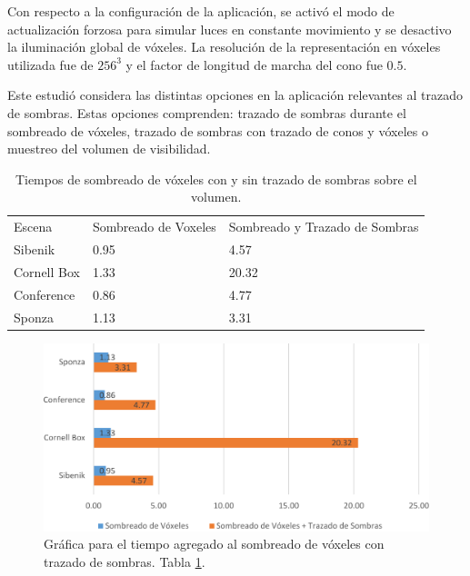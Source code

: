 Con respecto a la configuración de la aplicación, se activó el modo de actualización forzosa para simular luces en constante movimiento y se desactivo la iluminación global de vóxeles. La resolución de la representación en vóxeles utilizada fue de $256^3$ y el factor de longitud de marcha del cono fue $0.5$.

Este estudió considera las distintas opciones en la aplicación relevantes al trazado de sombras. Estas opciones comprenden: trazado de sombras durante el sombreado de vóxeles, trazado de sombras con trazado de conos y vóxeles o muestreo del volumen de visibilidad.

\begin{table}[h]
\centering
\begin{tabular}{lll}
                                  &                                           &                                                                \\ \hline
\multicolumn{1}{|l|}{Escena}      & \multicolumn{1}{l|}{Sombreado de Voxeles} & \multicolumn{1}{l|}{Sombreado y Trazado de Sombras} \\ \hline
\multicolumn{1}{|l|}{Sibenik}     & \multicolumn{1}{l|}{0.95}                 & \multicolumn{1}{l|}{4.57}                                      \\
\multicolumn{1}{|l|}{Cornell Box} & \multicolumn{1}{l|}{1.33}                 & \multicolumn{1}{l|}{20.32}                                     \\
\multicolumn{1}{|l|}{Conference}  & \multicolumn{1}{l|}{0.86}                 & \multicolumn{1}{l|}{4.77}                                      \\
\multicolumn{1}{|l|}{Sponza}      & \multicolumn{1}{l|}{1.13}                 & \multicolumn{1}{l|}{3.31}                                      \\ \hline
\end{tabular}
\caption{Tiempos de sombreado de vóxeles con y sin trazado de sombras sobre el volumen.}
\label{tab:voxelshading_shadowing}
\end{table}

\begin{figure}[h]
	\centering
	\includegraphics[width=0.95\linewidth]{media/voxelshading_shadow_cropped.pdf}
	\caption{Gráfica para el tiempo agregado al sombreado de vóxeles con trazado de sombras. Tabla \ref{tab:voxelshading_shadowing}.}
	\label{fig:voxelshading_shadowing}
\end{figure}

